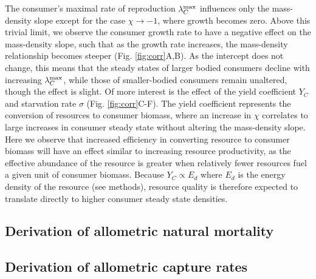\documentclass[]{rsos}%
\begin{document}
The consumer's maximal rate of reproduction $\lambda^{\rm max}_C$ influences only the mass-density slope except for the case $\chi \rightarrow -1$, where growth becomes zero.
Above this trivial limit, we observe the consumer growth rate to have a negative effect on the mass-density slope, such that as the growth rate increases, the mass-density relationship becomes steeper (Fig. \ref{fig:corr}A,B).
As the intercept does not change, this means that the steady states of larger bodied consumers decline with increasing $\lambda_C^{\rm max}$, while those of smaller-bodied consumers remain unaltered, though the effect is slight.
Of more interest is the effect of the yield coefficient $Y_C$ and starvation rate $\sigma$ (Fig. \ref{fig:corr}C-F).
The yield coefficient represents the conversion of resources to consumer biomass, where an increase in $\chi$ correlates to large increases in consumer steady state without altering the mass-density slope. 
Here we observe that increased efficiency in converting resource to consumer biomass will have an effect similar to increasing resource productivity, as the effective abundance of the resource is greater when relatively fewer resources fuel a given unit of consumer biomass.
Because $Y_C \propto E_d$ where $E_d$ is the energy density of the resource (see methods), resource quality is therefore expected to translate directly to higher consumer steady state densities.

\subsection{Derivation of allometric natural mortality}

\subsection{Derivation of allometric capture rates}

\end{document}
